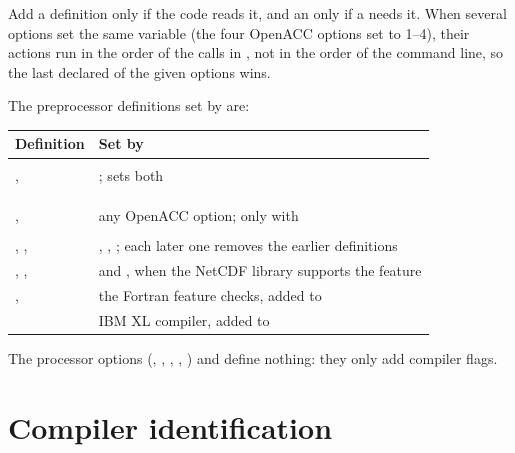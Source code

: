 Add a  definition only if the code reads it, and an
 only if a  needs it. When several
options set the same variable (the four OpenACC options set
 to 1--4), their actions run in the order of the
 calls in , not in the order of the
command line, so the last declared of the given options wins.

The preprocessor definitions set by  are:

\begin{longtable}{L{4.5cm} L{9cm}}
  \toprule
  \textbf{Definition} & \textbf{Set by} \\
  \midrule
  \endhead
  \bottomrule
  \endfoot
   &  \\
  ,  & ; 
    sets both \\
   &  \\
   &  \\
   &  \\
  ,  & any OpenACC option;  only
    with  \\
   &  \\
  , ,  &
    , ,
    ; each later one removes the earlier
    definitions \\
  , ,  &
     and , when the NetCDF library supports
    the feature \\
  ,  & the Fortran feature checks, added
    to  \\
   & IBM XL compiler, added to  \\
\end{longtable}

The processor options (, , ,
, ) and  define nothing: they
only add compiler flags.

\section{Compiler identification}
\label{sec:fcvendor}

